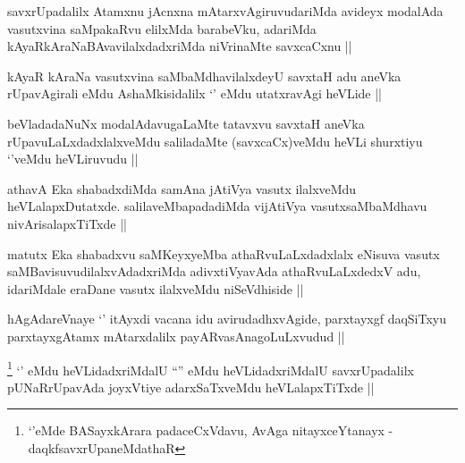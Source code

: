 
\begin{artha}
savxrUpadalilx Atamxnu jAcnxna mAtarxvAgiruvudariMda avideyx modalAda
vasutxvina saMpakaRvu elilxMda barabeVku, adariMda
kAyaRkAraNaBAvavilalxdadxriMda niVrinaMte savxcaCxnu ||
\end{artha}


\begin{artha}
kAyaR kAraNa vasutxvina saMbaMdhavilalxdeyU savxtaH adu aneVka
rUpavAgirali eMdu AshaMkisidalilx `\stext' eMdu utatxravAgi heVLide ||
\end{artha}

\begin{artha}
beVladadaNuNx modalAdavugaLaMte tatavxvu savxtaH aneVka
rUpavuLaLxdadxlalxveMdu saliladaMte (savxcaCx)veMdu heVLi shurxtiyu
`\stext'veMdu heVLiruvudu ||
\end{artha}


\begin{artha}
athavA Eka shabadxdiMda samAna jAtiVya vasutx ilalxveMdu
heVLalapxDutatxde. salilaveMbapadadiMda vijAtiVya vasutxsaMbaMdhavu
nivArisalapxTiTxde ||
\end{artha}

\begin{artha}
matutx Eka shabadxvu saMKeyxyeMba athaRvuLaLxdadxlalx eNisuva vasutx
saMBavisuvudilalxvAdadxriMda adivxtiVyavAda athaRvuLaLxdedxV adu,
idariMdale eraDane vasutx ilalxveMdu niSeVdhiside ||
\end{artha}

\begin{artha}
hAgAdareVnaye `\stext' itAyxdi vacana idu avirudadhxvAgide, parxtayxgf
daqSiTxyu parxtayxgAtamx mAtarxdalilx payARvasAnagoLuLxvudud ||
\end{artha}

\begin{artha}
\footnote[1]{`\stext'eMde BASayxkArara padaceCxVdavu, AvAga
  nitayxceYtanayx - daqkfsavxrUpaneMdathaR}
`\stext' eMdu heVLidadxriMdalU ``\stext'' eMdu heVLidadxriMdalU
  savxrUpadalilx pUNaRrUpavAda joyxVtiye adarxSaTxveMdu
  heVLalapxTiTxde ||
\end{artha}


